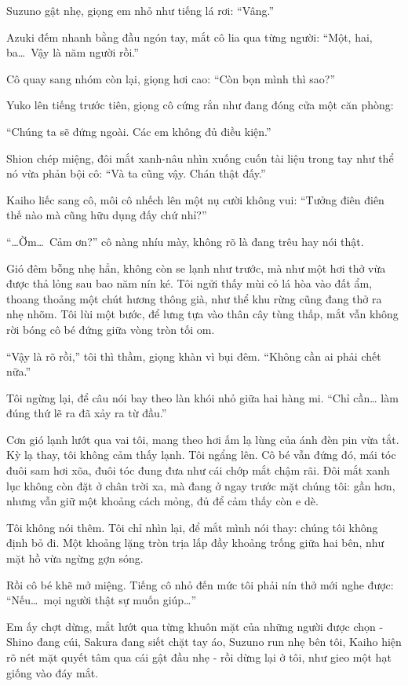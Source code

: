 \documentclass[../main.tex]{subfiles}
\begin{document}
Suzuno gật nhẹ, giọng em nhỏ như tiếng lá rơi: ``Vâng.''

Azuki đếm nhanh bằng đầu ngón tay, mắt cô lia qua từng người: ``Một, hai, ba\dots\ Vậy là năm người rồi.''

Cô quay sang nhóm còn lại, giọng hơi cao: ``Còn bọn mình thì sao?''

Yuko lên tiếng trước tiên, giọng cô cứng rắn như đang đóng cửa một căn phòng:

``Chúng ta sẽ đứng ngoài. Các em không đủ điều kiện.''

Shion chép miệng, đôi mắt xanh-nâu nhìn xuống cuốn tài liệu trong tay như thể nó vừa phản bội cô: ``Và ta cũng vậy. Chán thật đấy.''

Kaiho liếc sang cô, môi cô nhếch lên một nụ cười không vui: ``Tưởng điên điên thế nào mà cũng hữu dụng đấy chứ nhỉ?''

``\dots Ờm\dots\ Cảm ơn?'' cô nàng nhíu mày, không rõ là đang trêu hay nói thật.

Gió đêm bỗng nhẹ hẳn, không còn se lạnh như trước, mà như một hơi thở vừa được thả lỏng sau bao năm nín ké. Tôi ngửi thấy mùi cỏ lá hòa vào đất ẩm, thoang thoảng một chút hương thông già, như thể khu rừng cũng đang thở ra nhẹ nhõm. Tôi lùi một bước, để lưng tựa vào thân cây tùng thấp, mắt vẫn không rời bóng cô bé đứng giữa vòng tròn tối om.

``Vậy là rõ rồi,'' tôi thì thầm, giọng khàn vì bụi đêm. ``Không cần ai phải chết nữa.''

Tôi ngừng lại, để câu nói bay theo làn khói nhỏ giữa hai hàng mi. ``Chỉ cần… làm đúng thứ lẽ ra đã xảy ra từ đầu.''

Cơn gió lạnh lướt qua vai tôi, mang theo hơi ấm lạ lùng của ánh đèn pin vừa tắt. Kỳ lạ thay, tôi không cảm thấy lạnh. Tôi ngẩng lên. Cô bé vẫn đứng đó, mái tóc đuôi sam hơi xõa, đuôi tóc đung đưa như cái chớp mắt chậm rãi. Đôi mắt xanh lục không còn đặt ở chân trời xa, mà đang ở ngay trước mặt chúng tôi: gần hơn, nhưng vẫn giữ một khoảng cách mỏng, đủ để cảm thấy còn e dè.

Tôi không nói thêm. Tôi chỉ nhìn lại, để mắt mình nói thay: chúng tôi không định bỏ đi. Một khoảng lặng tròn trịa lấp đầy khoảng trống giữa hai bên, như mặt hồ vừa ngừng gợn sóng.

Rồi cô bé khẽ mở miệng. Tiếng cô nhỏ đến mức tôi phải nín thở mới nghe được: ``Nếu\dots\ mọi người thật sự muốn giúp\dots''

Em ấy chợt dừng, mắt lướt qua từng khuôn mặt của những người được chọn - Shino đang cúi, Sakura đang siết chặt tay áo, Suzuno run nhẹ bên tôi, Kaiho hiện rõ nét mặt quyết tâm qua cái gật đầu nhẹ - rồi dừng lại ở tôi, như gieo một hạt giống vào đáy mắt.
\end{document}
